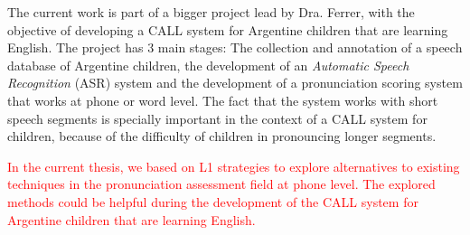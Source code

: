 
The current work is part of a bigger project lead by Dra. Ferrer, with the objective
of developing a CALL system for Argentine children that are learning English.
The project has 3 main stages: The collection and annotation of a speech database
of Argentine children, the development of an \textit{Automatic Speech Recognition} (ASR) system and the development of a pronunciation scoring system that works at phone or word
level. The fact that the system works with short speech segments is specially important in
the context of a CALL system for children, because of the difficulty of children in
pronouncing longer segments.

\textcolor{red}{
  In the current thesis, we based on L1 strategies to
  explore alternatives to existing techniques in the
  pronunciation assessment field at phone level. The explored
  methods could be helpful
  during the development of the CALL system for Argentine children that are learning English.
}
